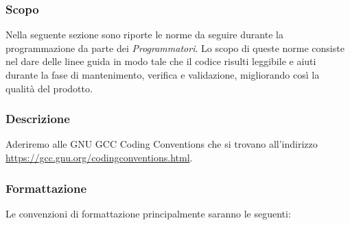 \documentclass[../NomeDocumento.tex]{subfiles}
\begin{document}
	\subsubsection{Scopo}
	
	Nella seguente sezione sono riporte le norme da seguire durante la programmazione da parte dei \textit{Programmatori}. Lo scopo di queste norme consiste nel dare delle linee guida in modo tale che il codice risulti leggibile e aiuti durante la fase di mantenimento, verifica e validazione, migliorando così la qualità del prodotto.

	\subsubsection{Descrizione}
	
	Aderiremo alle GNU GCC Coding Conventions che si trovano all'indirizzo \url{https://gcc.gnu.org/codingconventions.html}. 
	
	\subsubsection{Formattazione}
	
	Le convenzioni di formattazione principalmente saranno le seguenti:
	
\end{document}
